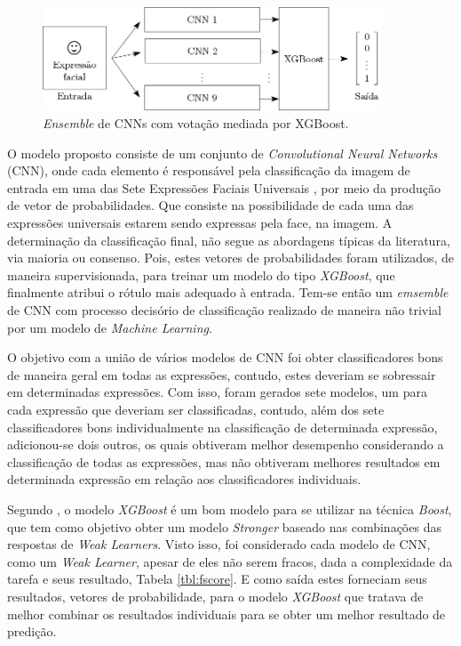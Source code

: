 \begin{figure}[!htb]
    \centering
    \caption{\emph{Ensemble} de CNNs com votação mediada por XGBoost.} \label{fig:ensemble}
    \includegraphics[width=0.9\textwidth]{images/ensemble-elloa.png}
\end{figure}




O modelo proposto consiste de um conjunto de \emph{Convolutional Neural Networks} (CNN), onde cada elemento é responsável pela classificação da imagem de entrada em uma das Sete Expressões Faciais Universais \cite{}, por meio da produção de vetor de probabilidades. Que consiste na possibilidade de cada uma das expressões universais estarem sendo expressas pela face, na imagem. A determinação da classificação final, não segue as abordagens típicas da literatura, via maioria ou consenso. Pois, estes vetores de probabilidades foram utilizados, de maneira supervisionada, para treinar um modelo do tipo \emph{XGBoost}, que finalmente atribui o rótulo mais adequado à entrada. Tem-se então um \emph{emsemble} de CNN com processo decisório de classificação realizado de maneira não trivial por um modelo de \emph{Machine Learning}.

O objetivo com a união de vários modelos de CNN foi obter classificadores bons de maneira geral em todas as expressões, contudo, estes deveriam se sobressair em determinadas expressões. Com isso, foram gerados sete modelos, um para cada expressão que deveriam ser classificadas, contudo, além dos sete classificadores bons individualmente na classificação de determinada expressão, adicionou-se dois outros, os quais obtiveram melhor desempenho considerando a classificação de todas as expressões, mas não obtiveram melhores resultados em determinada expressão em relação aos classificadores individuais.

Segundo \cite{}, o modelo \emph{XGBoost} é um bom modelo para se utilizar na técnica \emph{Boost}, que tem como objetivo obter um modelo \emph{Stronger} baseado nas combinações das respostas de \emph{Weak Learners}. Visto isso, foi considerado cada modelo de CNN, como um \emph{Weak Learner}, apesar de eles não serem fracos, dada a complexidade da tarefa e seus resultado, Tabela \ref{tbl:fscore}. E como saída estes forneciam seus resultados, vetores de probabilidade, para o modelo \emph{XGBoost} que tratava de melhor combinar os resultados individuais para se obter um melhor resultado de predição.

